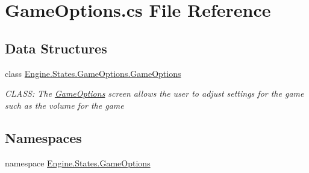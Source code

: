 \hypertarget{a00200}{}\section{Game\+Options.\+cs File Reference}
\label{a00200}
\subsection*{Data Structures}
\begin{DoxyCompactItemize}
\item 
class \hyperlink{a00558}{Engine.\+States.\+Game\+Options.\+Game\+Options}
\begin{DoxyCompactList}\small\item\em C\+L\+A\+SS\+: The \hyperlink{a00558}{Game\+Options} screen allows the user to adjust settings for the game such as the volume for the game \end{DoxyCompactList}\end{DoxyCompactItemize}
\subsection*{Namespaces}
\begin{DoxyCompactItemize}
\item 
namespace \hyperlink{a00278}{Engine.\+States.\+Game\+Options}
\end{DoxyCompactItemize}
